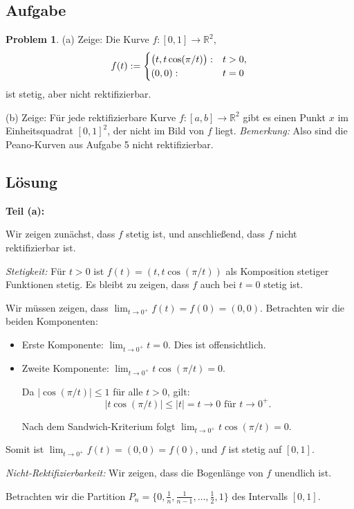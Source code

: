 \documentclass{article}
\newcommand{\R}{\mathbb{R}}
\theoremstyle{definition}
\newtheorem{prob}{Problem}
\begin{document}
\subsection*{Aufgabe}
\begin{prob}
(a) Zeige: Die Kurve $f:[0,1]\to\R^2$,
$$
   f(t) := \begin{cases}\bigl(t,t\cos(\pi/t)\bigr): &t>0, \cr (0,0):
   &t=0 \end{cases}
$$
ist stetig, aber nicht rektifizierbar.

(b) Zeige: Für jede rektifizierbare Kurve $f:[a,b]\to\R^2$ gibt es
einen Punkt $x$ im Einheitsquadrat $[0,1]^2$, der nicht im Bild von
$f$ liegt. {\it Bemerkung: }Also sind die Peano-Kurven aus Aufgabe 5
nicht rektifizierbar.   
\end{prob}

\subsection*{Lösung}

\textbf{Teil (a):}

Wir zeigen zunächst, dass $f$ stetig ist, und anschließend, dass $f$ nicht rektifizierbar ist.

\textit{Stetigkeit:} Für $t > 0$ ist $f(t) = (t, t\cos(\pi/t))$ als Komposition stetiger Funktionen stetig. Es bleibt zu zeigen, dass $f$ auch bei $t = 0$ stetig ist.

Wir müssen zeigen, dass $\lim_{t \to 0^+} f(t) = f(0) = (0,0)$. Betrachten wir die beiden Komponenten:
\begin{itemize}
    \item Erste Komponente: $\lim_{t \to 0^+} t = 0$. Dies ist offensichtlich.
    \item Zweite Komponente: $\lim_{t \to 0^+} t\cos(\pi/t) = 0$. 
    
    Da $|\cos(\pi/t)| \leq 1$ für alle $t > 0$, gilt:
    $$|t\cos(\pi/t)| \leq |t| = t \to 0 \text{ für } t \to 0^+.$$
    
    Nach dem Sandwich-Kriterium folgt $\lim_{t \to 0^+} t\cos(\pi/t) = 0$.
\end{itemize}

Somit ist $\lim_{t \to 0^+} f(t) = (0,0) = f(0)$, und $f$ ist stetig auf $[0,1]$.

\textit{Nicht-Rektifizierbarkeit:} Wir zeigen, dass die Bogenlänge von $f$ unendlich ist.

Betrachten wir die Partition $P_n = \{0, \frac{1}{n}, \frac{1}{n-1}, \ldots, \frac{1}{2}, 1\}$ des Intervalls $[0,1]$. 
\end{document}
